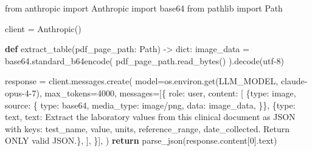 \documentclass[
  letterpaper,
  11pt]{scrbook}
\newenvironment{Shaded}{\begin{snugshade}}{\end{snugshade}}
\newcommand{\BuiltInTok}[1]{\textcolor[rgb]{0.00,0.23,0.31}{#1}}
\newcommand{\ControlFlowTok}[1]{\textcolor[rgb]{0.00,0.23,0.31}{\textbf{#1}}}
\newcommand{\DecValTok}[1]{\textcolor[rgb]{0.68,0.00,0.00}{#1}}
\newcommand{\ImportTok}[1]{\textcolor[rgb]{0.00,0.46,0.62}{#1}}
\newcommand{\KeywordTok}[1]{\textcolor[rgb]{0.00,0.23,0.31}{\textbf{#1}}}
\newcommand{\NormalTok}[1]{\textcolor[rgb]{0.00,0.23,0.31}{#1}}
\newcommand{\OperatorTok}[1]{\textcolor[rgb]{0.37,0.37,0.37}{#1}}
\newcommand{\StringTok}[1]{\textcolor[rgb]{0.13,0.47,0.30}{#1}}
\begin{document}
\begin{Shaded}
\begin{Highlighting}[]
\ImportTok{from}\NormalTok{ anthropic }\ImportTok{import}\NormalTok{ Anthropic}
\ImportTok{import}\NormalTok{ base64}
\ImportTok{from}\NormalTok{ pathlib }\ImportTok{import}\NormalTok{ Path}

\NormalTok{client }\OperatorTok{=}\NormalTok{ Anthropic()}

\KeywordTok{def}\NormalTok{ extract\_table(pdf\_page\_path: Path) }\OperatorTok{{-}\textgreater{}} \BuiltInTok{dict}\NormalTok{:}
\NormalTok{    image\_data }\OperatorTok{=}\NormalTok{ base64.standard\_b64encode(}
\NormalTok{        pdf\_page\_path.read\_bytes()}
\NormalTok{    ).decode(}\StringTok{\textquotesingle{}utf{-}8\textquotesingle{}}\NormalTok{)}

\NormalTok{    response }\OperatorTok{=}\NormalTok{ client.messages.create(}
\NormalTok{        model}\OperatorTok{=}\NormalTok{os.environ.get(}\StringTok{\textquotesingle{}LLM\_MODEL\textquotesingle{}}\NormalTok{, }\StringTok{\textquotesingle{}claude{-}opus{-}4{-}7\textquotesingle{}}\NormalTok{),}
\NormalTok{        max\_tokens}\OperatorTok{=}\DecValTok{4000}\NormalTok{,}
\NormalTok{        messages}\OperatorTok{=}\NormalTok{[\{}
            \StringTok{\textquotesingle{}role\textquotesingle{}}\NormalTok{: }\StringTok{\textquotesingle{}user\textquotesingle{}}\NormalTok{,}
            \StringTok{\textquotesingle{}content\textquotesingle{}}\NormalTok{: [}
\NormalTok{                \{}\StringTok{\textquotesingle{}type\textquotesingle{}}\NormalTok{: }\StringTok{\textquotesingle{}image\textquotesingle{}}\NormalTok{, }\StringTok{\textquotesingle{}source\textquotesingle{}}\NormalTok{: \{}
                    \StringTok{\textquotesingle{}type\textquotesingle{}}\NormalTok{: }\StringTok{\textquotesingle{}base64\textquotesingle{}}\NormalTok{,}
                    \StringTok{\textquotesingle{}media\_type\textquotesingle{}}\NormalTok{: }\StringTok{\textquotesingle{}image/png\textquotesingle{}}\NormalTok{,}
                    \StringTok{\textquotesingle{}data\textquotesingle{}}\NormalTok{: image\_data,}
\NormalTok{                \}\},}
\NormalTok{                \{}\StringTok{\textquotesingle{}type\textquotesingle{}}\NormalTok{: }\StringTok{\textquotesingle{}text\textquotesingle{}}\NormalTok{, }\StringTok{\textquotesingle{}text\textquotesingle{}}\NormalTok{:}
                 \StringTok{\textquotesingle{}Extract the laboratory values from \textquotesingle{}}
                 \StringTok{\textquotesingle{}this clinical document as JSON with \textquotesingle{}}
                 \StringTok{\textquotesingle{}keys: test\_name, value, units, \textquotesingle{}}
                 \StringTok{\textquotesingle{}reference\_range, date\_collected. \textquotesingle{}}
                 \StringTok{\textquotesingle{}Return ONLY valid JSON.\textquotesingle{}}\NormalTok{\},}
\NormalTok{            ],}
\NormalTok{        \}],}
\NormalTok{    )}
    \ControlFlowTok{return}\NormalTok{ parse\_json(response.content[}\DecValTok{0}\NormalTok{].text)}
\end{Highlighting}
\end{Shaded}
\end{document}

